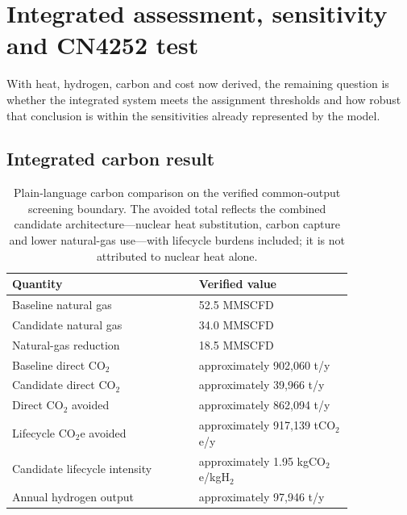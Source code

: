 \section{Integrated assessment, sensitivity and CN4252 test}
\label{sec:final-results}

With heat, hydrogen, carbon and cost now derived, the remaining question is whether the integrated system meets the assignment thresholds and how robust that conclusion is within the sensitivities already represented by the model.

\subsection{Integrated carbon result}
\begin{table}[htbp]\centering\small
\caption{Plain-language carbon comparison on the verified common-output screening boundary. The avoided total reflects the combined candidate architecture---nuclear heat substitution, carbon capture and lower natural-gas use---with lifecycle burdens included; it is not attributed to nuclear heat alone.}
\begin{tabular}{p{0.46\linewidth}p{0.38\linewidth}}
\toprule Quantity & Verified value \\ \midrule
Baseline natural gas & 52.5 MMSCFD~\cite{inltev953}\\
Candidate natural gas & 34.0 MMSCFD~\cite{inltev961}\\
Natural-gas reduction & 18.5 MMSCFD\\
Baseline direct CO$_2$ & approximately 902,060 t/y\\
Candidate direct CO$_2$ & approximately 39,966 t/y\\
Direct CO$_2$ avoided & approximately 862,094 t/y\\
Lifecycle CO$_2$e avoided & approximately 917,139 tCO$_2$e/y\\
Candidate lifecycle intensity & approximately 1.95 kgCO$_2$e/kgH$_2$\\
Annual hydrogen output & approximately 97,946 t/y\\
\bottomrule
\end{tabular}
\end{table}

